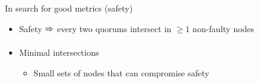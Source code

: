 \documentclass{beamer}
\DeclareMathOperator{\V}{\mathbf{V}}
\DeclareMathOperator{\Q}{\mathbf{Q}}
\newcommand{\U}{\mathcal{U}}
\newcommand{\Arrow}[1][]{$\xRightarrow{\text{#1}}$ }
\begin{document}
\begin{frame}{In search for good metrics (safety)}
  \begin{itemize}
    \item Safety \Arrow every two quorums intersect in $\ge1$ non-faulty nodes
  \end{itemize}
  \vfill
  \vfill
  \vfill
  \begin{itemize}
    \item \alert{Minimal intersections}
      \begin{itemize}
        \item Small sets of nodes that can compromise safety
      \end{itemize}
  \end{itemize}
\end{frame}
\end{document}
